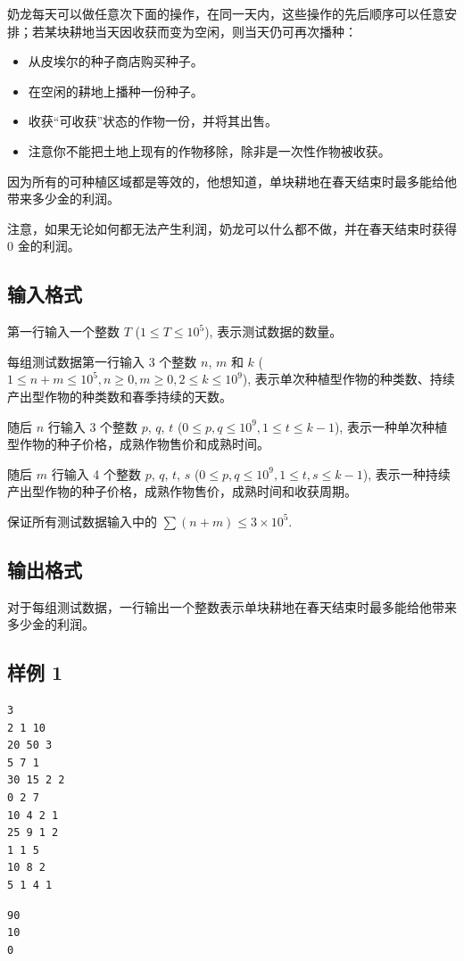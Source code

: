 奶龙每天可以做任意次下面的操作，在同一天内，这些操作的先后顺序可以任意安排；若某块耕地当天因收获而变为空闲，则当天仍可再次播种：

\begin{itemize}
	\item 从皮埃尔的种子商店购买种子。
	\item 在空闲的耕地上播种一份种子。
	\item 收获“可收获”状态的作物一份，并将其出售。
	\item 注意你不能把土地上现有的作物移除，除非是一次性作物被收获。
\end{itemize}

因为所有的可种植区域都是等效的，他想知道，单块耕地在春天结束时最多能给他带来多少金的利润。

注意，如果无论如何都无法产生利润，奶龙可以什么都不做，并在春天结束时获得 $0$ 金的利润。

\subsection{输入格式}

第一行输入一个整数 $T$ ($1 \le T \le 10^5$), 表示测试数据的数量。

每组测试数据第一行输入 3 个整数 $n$, $m$ 和 $k$ ($1 \le n + m \le 10^5, n \ge 0, m \ge 0, 2 \le k \le 10^9$), 表示单次种植型作物的种类数、持续产出型作物的种类数和春季持续的天数。

随后 $n$ 行输入 3 个整数 $p$, $q$, $t$ ($0 \le p , q \le 10^9, 1 \le t \le k - 1$), 表示一种单次种植型作物的种子价格，成熟作物售价和成熟时间。

随后 $m$ 行输入 4 个整数 $p$, $q$, $t$, $s$ ($0 \le p , q\le 10^9, 1 \le t, s \le k - 1$), 表示一种持续产出型作物的种子价格，成熟作物售价，成熟时间和收获周期。

保证所有测试数据输入中的 $\sum (n + m) \le 3 \times 10^5$.

\subsection{输出格式}

对于每组测试数据，一行输出一个整数表示单块耕地在春天结束时最多能给他带来多少金的利润。

\subsection{样例 1}

\begin{minipage}{\linewidth}
	\begin{minipage}[t]{0.49\linewidth}
		\begin{lstlisting}[title=\texttt{standard input}]
3
2 1 10
20 50 3
5 7 1
30 15 2 2
0 2 7
10 4 2 1
25 9 1 2
1 1 5
10 8 2
5 1 4 1
\end{lstlisting}
	\end{minipage}
	\begin{minipage}[t]{0.49\linewidth}
		\begin{lstlisting}[title=\texttt{standard output}]
90
10
0
\end{lstlisting}
	\end{minipage}
\end{minipage}


